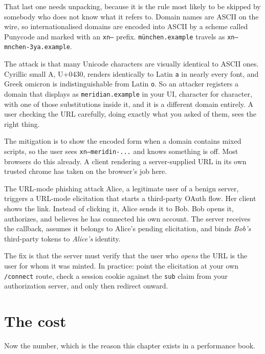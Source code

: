That last one needs unpacking, because it is the rule most likely to be skipped
by somebody who does not know what it refers to. Domain names are ASCII on the
wire, so internationalised domains are encoded into ASCII by a scheme called
Punycode and marked with an \texttt{xn--} prefix. \texttt{münchen.example}
travels as \texttt{xn--mnchen-3ya.example}.

The attack is that many Unicode characters are visually identical to ASCII ones.
Cyrillic small A, U+0430, renders identically to Latin \texttt{a} in nearly
every font, and Greek omicron is indistinguishable from Latin \texttt{o}. So an attacker registers a domain that displays as \texttt{meridian.example} in
your UI, character for character, with one of those substitutions inside it,
and it is a different domain entirely. A user checking the URL carefully, doing exactly what
you asked of them, sees the right thing.

The mitigation is to show the encoded form when a domain contains mixed scripts,
so the user sees \texttt{xn--meridin-...} and knows something is off. Most
browsers do this already. A client rendering a server-supplied URL in its own
trusted chrome has taken on the browser's job here.

\begin{dangerbox}{The URL-mode phishing attack}
Alice, a legitimate user of a benign server, triggers a URL-mode elicitation
that starts a third-party OAuth flow. Her client shows the link. Instead of
clicking it, Alice sends it to Bob. Bob opens it, authorizes, and believes he
has connected his own account. The server receives the callback, assumes it
belongs to Alice's pending elicitation, and binds \emph{Bob's} third-party
tokens to \emph{Alice's} identity.

The fix is that the server must verify that the user who \emph{opens} the URL is
the user for whom it was minted. In practice: point the elicitation at your own
\texttt{/connect} route, check a session cookie against the \texttt{sub} claim
from your authorization server, and only then redirect onward.
\end{dangerbox}

\section{The cost}

Now the number, which is the reason this chapter exists in a performance book.


